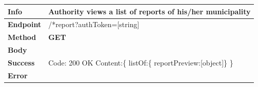 


\begin{table}[H]
\begin{tabular}{|l|p{}|}
\hline
\textbf{Info}             & Authority views a list of reports of his/her municipality                                                              \\ \hline
\textbf{Endpoint}    &  /*report?authToken=[string] \\ \hline
\textbf{Method}         &   \textbf{GET}                                                                            \\ \hline

\textbf{Body}  & 
                    \\ \hline
                    
\textbf{Success} &  Code: 200 OK \newline
                    Content:\{\newline 
                    listOf:\{\newline
                    reportPreview:[object]\newline\}\newline
                    \}\\ \hline
\textbf{Error} &  
                \\\hline

\end{tabular}
\end{table}







